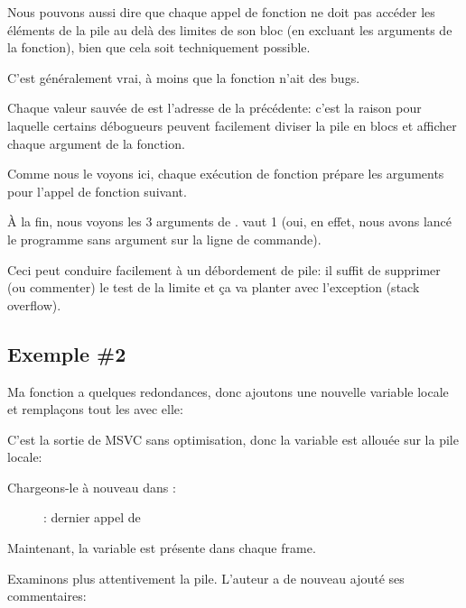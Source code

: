 Nous pouvons aussi dire que chaque appel de fonction ne doit pas accéder les éléments
de la pile au delà des limites de son bloc (en excluant les arguments de la fonction),
bien que cela soit techniquement possible.

C'est généralement vrai, à moins que la fonction n'ait des bugs.

Chaque valeur sauvée de \EBP est l'adresse de la  précédente:
c'est la raison pour laquelle certains débogueurs peuvent facilement diviser la pile
en blocs et afficher chaque argument de la fonction.

Comme nous le voyons ici, chaque exécution de fonction prépare les arguments pour
l'appel de fonction suivant.

À la fin, nous voyons les 3 arguments de \main.
 vaut 1 (oui, en effet, nous avons lancé le programme sans argument sur
la ligne de commande).

Ceci peut conduire facilement à un débordement de pile: il suffit de supprimer (ou
commenter) le test de la limite et ça va planter avec l'exception  (stack overflow).

\subsection{Exemple \#2}

Ma fonction a quelques redondances, donc ajoutons une nouvelle variable locale 
et remplaçons tout les  avec elle:



C'est la sortie de MSVC sans optimisation, donc la variable  est allouée
sur la pile locale:



\clearpage
Chargeons-le à nouveau dans \olly:

\begin{figure}[H]
\centering
{}
\caption{\olly: dernier appel de \ttf{}}
\label{fig:fib_olly2}
\end{figure}

Maintenant, la variable  est présente dans chaque frame.

\clearpage

Examinons plus attentivement la pile. L'auteur a de nouveau ajouté ses commentaires:

